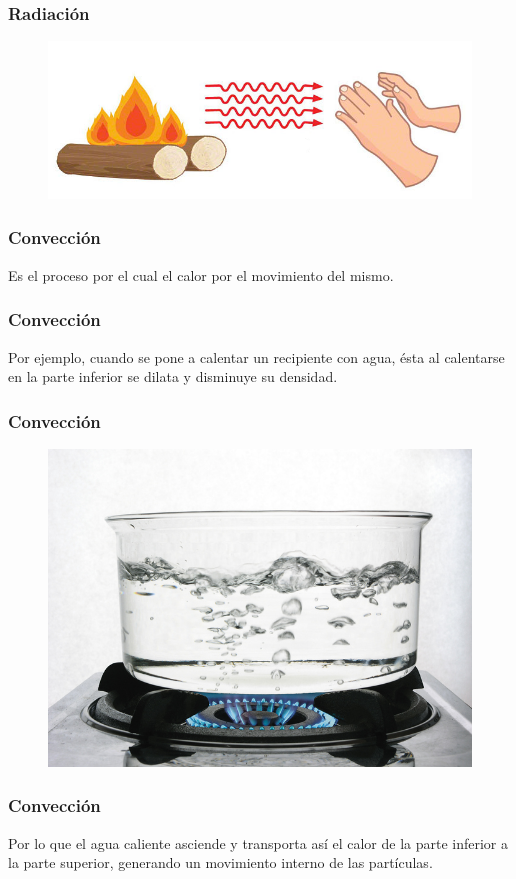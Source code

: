 \documentclass[14pt]{beamer}
\begin{document}
\begin{frame}
\frametitle{Radiación}
\begin{figure}
    \centering
    \includegraphics[scale=0.5]{Imagenes/Calor_02.png}
\end{figure}
\end{frame}
\begin{frame}
\frametitle{Convección}
Es el proceso por el cual el calor  por el movimiento del mismo.
\end{frame}
\begin{frame}
\frametitle{Convección}
Por ejemplo, cuando se pone a calentar un recipiente con agua, ésta al calentarse en la parte inferior se dilata y disminuye su densidad.
\end{frame}
\begin{frame}
\frametitle{Convección}
\begin{figure}
    \centering
    \includegraphics[scale=0.25]{Imagenes/Calor_01.jpg}
\end{figure}
\end{frame}
\begin{frame}
\frametitle{Convección}
Por lo que el agua caliente asciende y transporta así el calor de la parte inferior a la parte superior, generando un movimiento interno de las partículas.
\end{frame}
\end{document}
